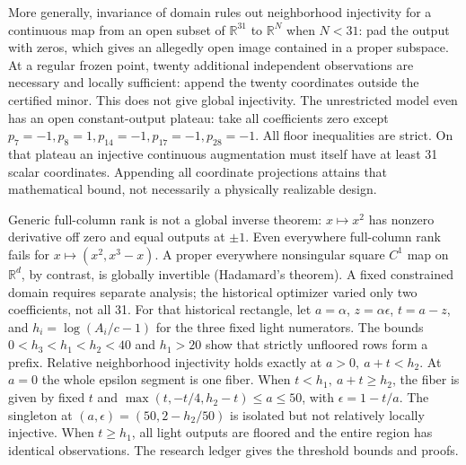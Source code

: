 \documentclass[11pt]{article}
\newcommand{\R}{\mathbb{R}}
\begin{document}
More generally, invariance of domain rules out neighborhood
injectivity for a continuous map from an open subset of
\(\R^{31}\) to \(\R^N\) when \(N<31\): pad the output with zeros,
which gives an allegedly open image contained in a proper subspace.
At a regular frozen point, twenty additional independent observations
are necessary and locally sufficient: append the twenty coordinates
outside the certified minor. This does not give global injectivity.
The unrestricted model even has an open constant-output plateau:
take all coefficients zero except \(p_7=-1,p_8=1,p_{14}=-1,
p_{17}=-1,p_{28}=-1\). All floor inequalities are strict. On that
plateau an injective continuous augmentation must itself have at least
31 scalar coordinates. Appending all coordinate projections attains
that mathematical bound, not necessarily a physically realizable design.

Generic full-column rank is not a global inverse theorem: \(x\mapsto
x^2\) has nonzero derivative off zero and equal outputs at \(\pm1\).
Even everywhere full-column rank fails for
\(x\mapsto(x^2,x^3-x)\). A proper everywhere nonsingular square
\(C^1\) map on \(\R^d\), by contrast, is globally invertible
(Hadamard's theorem). A fixed constrained domain requires separate
analysis; the historical optimizer varied only two coefficients,
not all 31. For that historical rectangle, let \(a=\alpha\),
\(z=\alpha\epsilon\), \(t=a-z\), and
\(h_i=\log(A_i/c-1)\) for the three fixed light numerators.
The bounds \(0<h_3<h_1<h_2<40\) and \(h_1>20\) show
that strictly unfloored rows form a prefix. Relative neighborhood
injectivity holds exactly at \(a>0,\ a+t<h_2\). At \(a=0\) the
whole epsilon segment is one fiber. When \(t<h_1,\ a+t\ge h_2\),
the fiber is given by fixed \(t\) and
\(\max(t,-t/4,h_2-t)\le a\le50\), with
\(\epsilon=1-t/a\). The singleton at
\((a,\epsilon)=(50,2-h_2/50)\) is isolated but not relatively
locally injective. When \(t\ge h_1\), all light outputs are
floored and the entire region has identical observations.
The research ledger gives the threshold bounds and proofs.
\end{document}
